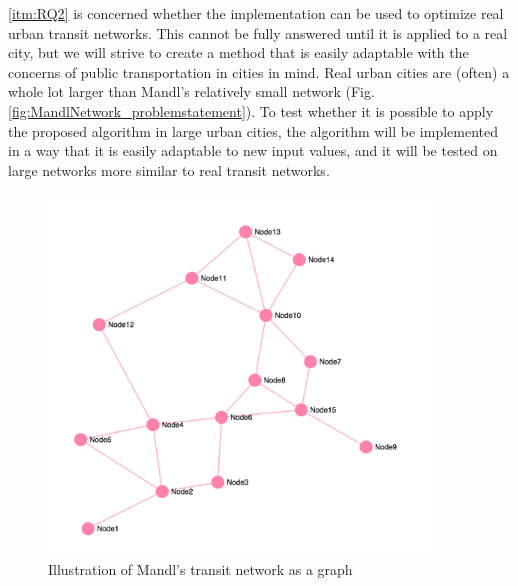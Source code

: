 \vref{itm:RQ2} is concerned whether the implementation can be used to optimize real urban transit networks. This cannot be fully answered until it is applied to a real city, but we will strive to create a method that is easily adaptable with the concerns of public transportation in cities in mind. Real urban cities are (often) a whole lot larger than Mandl's relatively small network (Fig. \vref{fig:MandlNetwork_problemstatement}). To  test whether it is possible to apply the proposed algorithm in large urban cities, the algorithm will be implemented in a way that it is easily adaptable to new input values, and it will be tested on large networks more similar to real transit networks. 



\begin{figure}[H]
\begin{center}
  \includegraphics[width=4in]{assets/mandlnetwork_crop.png}
  \end{center}
  \caption{Illustration of Mandl's transit network as a graph}
  \label{fig:MandlNetwork_problemstatement} 
\end{figure}


